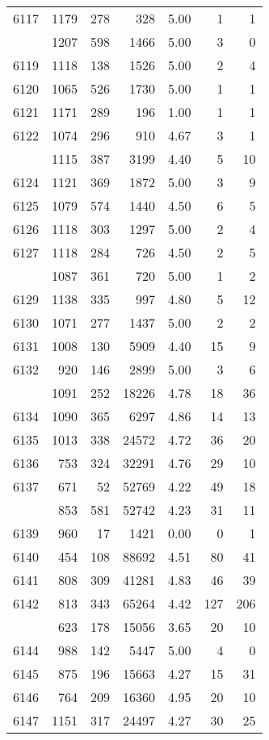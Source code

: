 \documentclass[
]{article}
\begin{document}
\begin{table}
\begin{tabular}[t]{lrrrrrr}
6117 & 1179 & 278 & 328 & 5.00 & 1 & 1\\
\addlinespace
6118 & 1207 & 598 & 1466 & 5.00 & 3 & 0\\
6119 & 1118 & 138 & 1526 & 5.00 & 2 & 4\\
6120 & 1065 & 526 & 1730 & 5.00 & 1 & 1\\
6121 & 1171 & 289 & 196 & 1.00 & 1 & 1\\
6122 & 1074 & 296 & 910 & 4.67 & 3 & 1\\
\addlinespace
6123 & 1115 & 387 & 3199 & 4.40 & 5 & 10\\
6124 & 1121 & 369 & 1872 & 5.00 & 3 & 9\\
6125 & 1079 & 574 & 1440 & 4.50 & 6 & 5\\
6126 & 1118 & 303 & 1297 & 5.00 & 2 & 4\\
6127 & 1118 & 284 & 726 & 4.50 & 2 & 5\\
\addlinespace
6128 & 1087 & 361 & 720 & 5.00 & 1 & 2\\
6129 & 1138 & 335 & 997 & 4.80 & 5 & 12\\
6130 & 1071 & 277 & 1437 & 5.00 & 2 & 2\\
6131 & 1008 & 130 & 5909 & 4.40 & 15 & 9\\
6132 & 920 & 146 & 2899 & 5.00 & 3 & 6\\
\addlinespace
6133 & 1091 & 252 & 18226 & 4.78 & 18 & 36\\
6134 & 1090 & 365 & 6297 & 4.86 & 14 & 13\\
6135 & 1013 & 338 & 24572 & 4.72 & 36 & 20\\
6136 & 753 & 324 & 32291 & 4.76 & 29 & 10\\
6137 & 671 & 52 & 52769 & 4.22 & 49 & 18\\
\addlinespace
6138 & 853 & 581 & 52742 & 4.23 & 31 & 11\\
6139 & 960 & 17 & 1421 & 0.00 & 0 & 1\\
6140 & 454 & 108 & 88692 & 4.51 & 80 & 41\\
6141 & 808 & 309 & 41281 & 4.83 & 46 & 39\\
6142 & 813 & 343 & 65264 & 4.42 & 127 & 206\\
\addlinespace
6143 & 623 & 178 & 15056 & 3.65 & 20 & 10\\
6144 & 988 & 142 & 5447 & 5.00 & 4 & 0\\
6145 & 875 & 196 & 15663 & 4.27 & 15 & 31\\
6146 & 764 & 209 & 16360 & 4.95 & 20 & 10\\
6147 & 1151 & 317 & 24497 & 4.27 & 30 & 25\\

\end{tabular}
\end{table}
\end{document}

